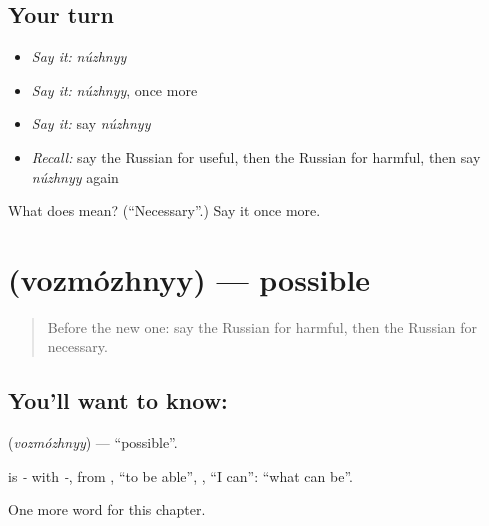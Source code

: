 \subsection*{Your turn}
\begin{itemize}
\raggedright
  \item \emph{Say it:} \emph{núzhnyy}
  \item \emph{Say it:} \emph{núzhnyy}, once more
  \item \emph{Say it:} say \emph{núzhnyy}
  \item \emph{Recall:} say the Russian for useful, then the Russian for harmful, then say \emph{núzhnyy} again
\end{itemize}

\begin{tcolorbox}[breakable,colback=teal!4,colframe=teal!35!black,title={Before you move on}]
What does  mean? (\textquotedblleft{}Necessary\textquotedblright{}.) Say it once more.
\end{tcolorbox}
\section[\texorpdfstring{\ru{возможный} (vozmózhnyy)}{возможный (vozmózhnyy)}]{ (vozmózhnyy) — possible}

\label{lesson:RU-C188-vozmozhnyy}



\begin{quote}
Before the new one: say the Russian for harmful, then the Russian for necessary.
\end{quote}

\subsection*{You'll want to know: }
\textbf{} (\emph{vozmózhnyy}) — \textquotedblleft{}possible\textquotedblright{}.

\begin{cousinweb}
\textbf{} is \emph{-} with \emph{-}, from \emph{}, \textquotedblleft{}to be able\textquotedblright{}, \emph{}, \textquotedblleft{}I can\textquotedblright{}: \textquotedblleft{}what can be\textquotedblright{}.
\end{cousinweb}

\begin{grammarlens}[title={What you've built}]
One more word for this chapter.
\end{grammarlens}

